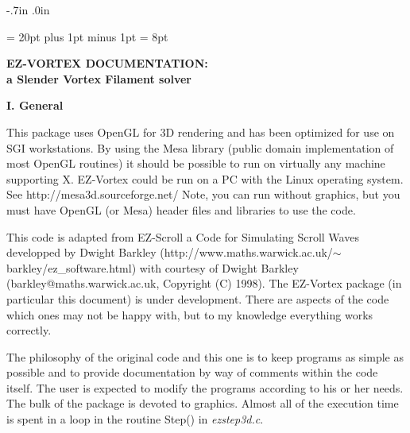 % 


\textheight 9in  \textwidth 6.5in
\topmargin -.7in \oddsidemargin .0in

\newcommand{\vX}{ \mbox{\bf X}}
\newcommand{\vv} { \mbox{\bf v}}
\newcommand{\vA} { \mbox{\bf A}}
\newcommand{\vb}{ \mbox{\bf b}}
\newcommand{\vn}{ \mbox{\bf n}}
\newcommand{\vtau}{\mbox{\bf t} }
\newcommand{\rb}{\bar r}
\newcommand{\eps}{\epsilon}


\baselineskip = 20pt plus 1pt minus 1pt
\parskip = 8pt
\parindent=0pt

\begin{center} 
{\bf EZ-VORTEX DOCUMENTATION: \\ \large a Slender Vortex Filament solver} 
\end{center} 

\bigskip
{\bf I. General} 
\smallskip

This package uses OpenGL for 3D rendering and has been optimized for
use on SGI workstations.  By using the Mesa library (public domain
implementation of most OpenGL routines) it should be possible to run
on virtually any machine supporting X.  EZ-Vortex could be  run on
a PC with the Linux operating system.  See
http://mesa3d.sourceforge.net/
Note, you can run without graphics, but you must have OpenGL (or Mesa)
header files and libraries to use the code.

This code is adapted from  EZ-Scroll a Code for Simulating 
Scroll Waves  developped by Dwight Barkley (http://www.maths.warwick.ac.uk/$\sim$barkley/ez\_software.html) with courtesy of Dwight Barkley (barkley@maths.warwick.ac.uk, Copyright (C) 1998). The EZ-Vortex package (in particular this document) is under development. There are aspects of the code which ones may  not be happy with, but to my knowledge everything works correctly.

The philosophy of the original code and this one is to keep programs as simple as possible and to
provide documentation by way of comments within the code itself.  The
user is expected to modify the programs according to his or her needs.
The bulk of the package is devoted to graphics. Almost all of the
execution time is spent in a loop in the routine {\sf Step()} in {\em
ezstep3d.c}.


